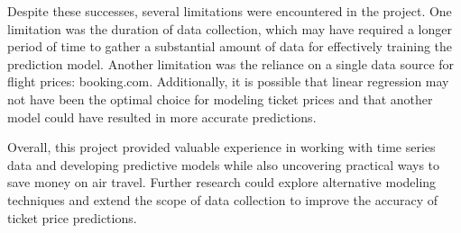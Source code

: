 Despite these successes, several limitations were encountered in the project.
One limitation was the duration of data collection, which may have required a longer period of time to gather a substantial amount of data for effectively training the prediction model.
Another limitation was the reliance on a single data source for flight prices: booking.com. Additionally, it is possible that linear regression may not have been the optimal choice for modeling ticket prices and that another model could have resulted in more accurate predictions.

Overall, this project provided valuable experience in working with time series data and developing predictive models while also uncovering practical ways to save money on air travel.
Further research could explore alternative modeling techniques and extend the scope of data collection to improve the accuracy of ticket price predictions.



